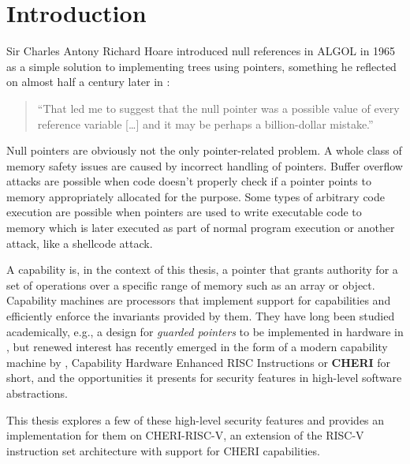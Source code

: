 \documentclass[main.tex]{subfiles}
\begin{document}
\onlyinsubfile{\mainmatter{}}

\chapter{Introduction}
Sir Charles Antony Richard Hoare introduced null references in ALGOL in 1965 as a simple solution to implementing trees using pointers, something he reflected on almost half a century later in \cite{null}:
\begin{quote}
	\enquote{That led me to suggest that the null pointer was a possible value of every reference variable […] and it may be perhaps a billion-dollar mistake.}
\end{quote}

Null pointers are obviously not the only pointer-related problem. A whole class of memory safety issues are caused by incorrect handling of pointers. Buffer overflow attacks are possible when code doesn't properly check if a pointer points to memory appropriately allocated for the purpose. Some types of arbitrary code execution are possible when pointers are used to write executable code to memory which is later executed as part of normal program execution or another attack, like a shellcode attack.

A capability is, in the context of this thesis, a pointer that grants authority for a set of operations over a specific range of memory such as an array or object. Capability machines are processors that implement support for capabilities and efficiently enforce the invariants provided by them. They have long been studied academically, e.g., a design for \emph{guarded pointers} to be implemented in hardware in \cite{guardedptrs}, but renewed interest has recently emerged in the form of a modern capability machine by \cite{intro2cheri}, Capability Hardware Enhanced RISC Instructions or \textbf{CHERI} for short, and the opportunities it presents for security features in high-level software abstractions.

This thesis explores a few of these high-level security features and provides an implementation for them on CHERI-RISC-V, an extension of the RISC-V instruction set architecture with support for CHERI capabilities.


\biblio{}
\onlyinsubfile{\glsaddall\printglossaries}
\end{document}
